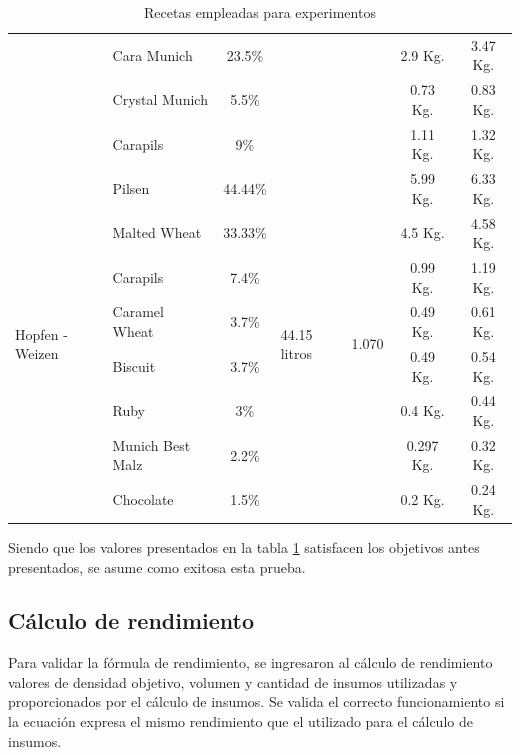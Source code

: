 \begin{table}[H]
\begin{tabularx}{\textwidth}{|X|X|X|X|X|X|X|}
         & Cara Munich & \multicolumn{1}{c|}{23.5\%} & & &\multicolumn{1}{c|}{2.9 Kg.} &\multicolumn{1}{c|}{3.47 Kg.} \\
        & Crystal Munich & \multicolumn{1}{c|}{5.5\%} & & &\multicolumn{1}{c|}{0.73 Kg.} &\multicolumn{1}{c|}{0.83 Kg.} \\
        & Carapils & \multicolumn{1}{c|}{9\%} & & &\multicolumn{1}{c|}{1.11 Kg.} &\multicolumn{1}{c|}{1.32 Kg.} \\
        \hline
        \multirow{8}{2cm}{Hopfen - Weizen} & Pilsen &\multicolumn{1}{c|}{44.44\%}  &\multirow{8}{2cm}{44.15 litros}  &\multirow{8}{2cm}{1.070} & \multicolumn{1}{c|}{5.99 Kg.} & \multicolumn{1}{c|}{6.33 Kg.}\\
         & Malted Wheat & \multicolumn{1}{c|}{33.33\%} & & &\multicolumn{1}{c|}{4.5 Kg.} &\multicolumn{1}{c|}{4.58 Kg.} \\
         & Carapils & \multicolumn{1}{c|}{7.4\%} & & &\multicolumn{1}{c|}{0.99 Kg.} &\multicolumn{1}{c|}{1.19 Kg.} \\
         & Caramel Wheat & \multicolumn{1}{c|}{3.7\%} & & &\multicolumn{1}{c|}{0.49 Kg.} &\multicolumn{1}{c|}{0.61 Kg.} \\
         & Biscuit & \multicolumn{1}{c|}{3.7\%} & & &\multicolumn{1}{c|}{0.49 Kg.} &\multicolumn{1}{c|}{0.54 Kg.} \\
         & Ruby & \multicolumn{1}{c|}{3\%} & & &\multicolumn{1}{c|}{0.4 Kg.} &\multicolumn{1}{c|}{0.44 Kg.} \\
         & Munich Best Malz & \multicolumn{1}{c|}{2.2\%} & & &\multicolumn{1}{c|}{0.297 Kg.} &\multicolumn{1}{c|}{0.32 Kg.} \\
         & Chocolate & \multicolumn{1}{c|}{1.5\%} & & &\multicolumn{1}{c|}{0.2 Kg.} &\multicolumn{1}{c|}{0.24 Kg.} \\
        \hline
    \end{tabularx}
    \caption{Recetas empleadas para experimentos}
    \label{tab:TablaRecetaExperimentos}
\end{table}
\par Siendo que los valores presentados en la tabla \ref{tab:TablaRecetaExperimentos} satisfacen los objetivos antes presentados, se asume como exitosa esta prueba.

\subsection{Cálculo de rendimiento}
Para validar la fórmula de rendimiento, se ingresaron al cálculo de rendimiento valores de densidad objetivo, volumen y cantidad de insumos utilizadas y proporcionados por el cálculo de insumos. Se valida el correcto funcionamiento si la ecuación expresa el mismo rendimiento que el utilizado para el cálculo de insumos.


